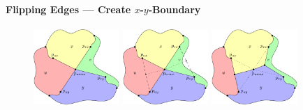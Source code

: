 \documentclass[t,18pt]{beamer}
\newcommand{\emdash}{---}
\begin{document}
\begin{frame}[c]
  \frametitle{}
  \framesubtitle{Flipping Edges \emdash{} Create $x$-$y$-Boundary}
  \begin{figure}
    \includegraphics[width=3.25cm]{../Thesis/Resources/FlipEdge-StretchBoundary-1.pdf}
    \quad
    \includegraphics[width=3.25cm]{../Thesis/Resources/FlipEdge-StretchBoundary-2.pdf}
    \quad
    \includegraphics[width=3.25cm]{../Thesis/Resources/FlipEdge-StretchBoundary-3.pdf}
  \end{figure}
\end{frame}
\end{document}
